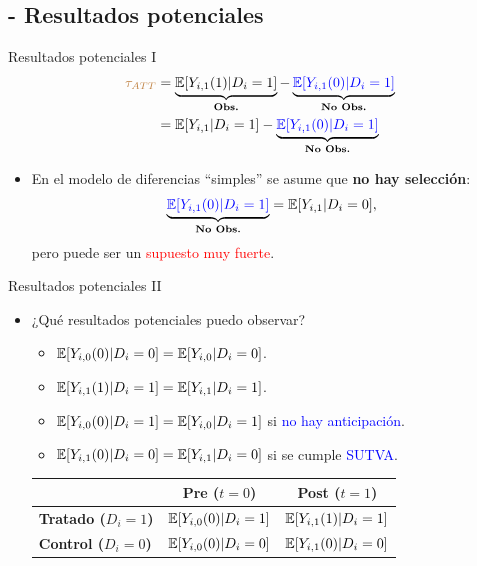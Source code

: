 \documentclass[10pt, xcolor=dvipsnames]{beamer}
\begin{document}
\subsection{- Resultados potenciales}

\setlength\extrarowheight{7pt}
\begin{frame}{Resultados potenciales I}
	\begin{align*}
    \begin{split}
        \textcolor{brown}{\tau_{ATT}} &= \underbrace{\operatorname{\mathbb{E}}[Y_{i,1}(1)|D_i = 1]}_{\text{\textbf{Obs.}}} - \underbrace{\textcolor{blue}{\operatorname{\mathbb{E}}[Y_{i,1}(0)|D_i = 1]}}_{\text{\textbf{No Obs.}}} \\ 
        &= \operatorname{\mathbb{E}}[Y_{i,1} | D_i = 1] - \underbrace{\textcolor{blue}{\operatorname{\mathbb{E}}[Y_{i,1}(0)|D_i = 1]}}_{\text{\textbf{No Obs.}}}        
    \end{split}
    \end{align*}
    \vspace{-1.0em}
	\pause
\begin{itemize}\setlength{\itemsep}{1.0em}
	\item En el modelo de diferencias ``simples'' se asume que \textbf{no hay selección}:
    \[
    \underbrace{\textcolor{blue}{\operatorname{\mathbb{E}}[Y_{i,1}(0)|D_i = 1]}}_{\text{\textbf{No Obs.}}} = \operatorname{\mathbb{E}}[Y_{i,1} | D_i = 0],
    \]
    pero puede ser un \textcolor{red}{supuesto muy fuerte}.
\end{itemize}  
\end{frame}


\begin{frame}{Resultados potenciales II}
\begin{itemize}
	\item ¿Qué resultados potenciales puedo observar? \smallspace
    \begin{itemize}
        \item \(\operatorname{\mathbb{E}}[Y_{i,0}(0)|D_i = 0] = \operatorname{\mathbb{E}}[Y_{i,0}|D_i = 0]\).
        \item \(\operatorname{\mathbb{E}}[Y_{i,1}(1)|D_i = 1] = \operatorname{\mathbb{E}}[Y_{i,1}|D_i = 1]\).
        \item \(\operatorname{\mathbb{E}}[Y_{i,0}(0)|D_i = 1] = \operatorname{\mathbb{E}}[Y_{i,0}|D_i = 1]\) si \textcolor{blue}{no hay anticipación}.
        \item \(\operatorname{\mathbb{E}}[Y_{i,1}(0)|D_i = 0] = \operatorname{\mathbb{E}}[Y_{i,1}|D_i = 0]\) si se cumple \textcolor{blue}{SUTVA}.        
    \end{itemize}
    \vspace{1em}
	\begin{center}
		\begin{tabular}{ | l | c | c |}
			\hline
			& \textbf{Pre ($t=0$)} & \textbf{Post ($t=1$}) \\ \hline		
			\textbf{Tratado ($D_i=1$)} & $\operatorname{\mathbb{E}}[Y_{i,0}(0)|D_i = 1]$ & $\operatorname{\mathbb{E}}[Y_{i,1}(1)|D_i = 1]$ \\ \hline
			\textbf{Control ($D_i=0$)} & $\operatorname{\mathbb{E}}[Y_{i,0}(0)|D_i = 0]$ & $\operatorname{\mathbb{E}}[Y_{i,1}(0)|D_i = 0]$ \\ \hline
		\end{tabular}
	\end{center}
    \end{itemize}	
\end{frame}
\end{document}
